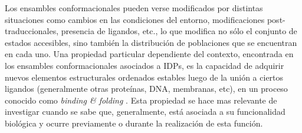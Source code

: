 Los ensambles conformacionales pueden verse modificados por distintas situaciones como cambios en las condiciones del entorno, modificaciones post-traduccionales, presencia de ligandos, etc.,
lo que modifica no sólo el conjunto de estados accesibles, sino también la distribución de poblaciones que se encuentran en cada uno.
Una propiedad particular dependiente del contexto, encontrada en los ensambles conformacionales asociados a IDPs, es la capacidad de adquirir nuevos elementos estructurales ordenados estables luego de la unión a ciertos ligandos 
(generalmente otras proteínas, DNA, membranas, etc), en un proceso conocido como \textit{binding \& folding} \cite{dyson2005intrinsically}. 
Esta propiedad se hace mas relevante de investigar cuando se sabe que, generalmente, está asociada a su funcionalidad biológica y ocurre previamente o durante la realización de esta función.


% 


